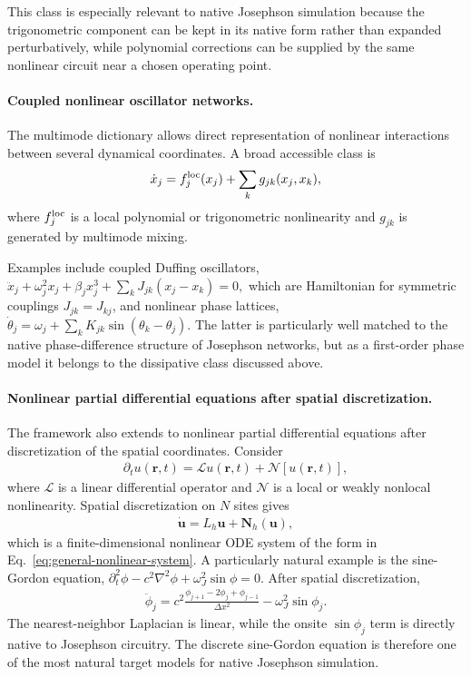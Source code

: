 \documentclass[pra,twocolumn,superscriptaddress,nofootinbib,floatfix]{revtex4-2}
\theoremstyle{remark}
\begin{document}
This class is especially relevant to native Josephson simulation because the trigonometric component can be kept in its native form rather than expanded perturbatively, while polynomial corrections can be supplied by the same nonlinear circuit near a chosen operating point.

\paragraph{Coupled nonlinear oscillator networks.}
The multimode dictionary allows direct representation of nonlinear interactions between several dynamical coordinates. A broad accessible class is
\begin{align}
\dot x_j=f_j^{\rm loc}(x_j)+\sum_{k}g_{jk}(x_j,x_k),
\label{eq:coupled-network}
\end{align}
where \(f_j^{\rm loc}\) is a local polynomial or trigonometric nonlinearity and \(g_{jk}\) is generated by multimode mixing.

Examples include coupled Duffing oscillators,
\(\ddot x_j+\omega_j^2x_j+\beta_jx_j^3+\sum_kJ_{jk}(x_j-x_k)=0,\)
which are Hamiltonian for symmetric couplings \(J_{jk}=J_{kj}\), and nonlinear phase lattices,
\(\dot\theta_j=\omega_j+\sum_kK_{jk}\sin(\theta_k-\theta_j).\)
The latter is particularly well matched to the native phase-difference structure of Josephson networks, but as a first-order phase model it belongs to the dissipative class discussed above.

\paragraph{Nonlinear partial differential equations after spatial discretization.}
The framework also extends to nonlinear partial differential equations after discretization of the spatial coordinates. Consider
\begin{align}
\partial_t u(\mathbf r,t)=\mathcal L u(\mathbf r,t)+\mathcal N[u(\mathbf r,t)],
\label{eq:general-pde}
\end{align}
where \(\mathcal L\) is a linear differential operator and \(\mathcal N\) is a local or weakly nonlocal nonlinearity. Spatial discretization on \(N\) sites gives
\begin{align}
\dot{\mathbf u}=L_h\mathbf u+\mathbf N_h(\mathbf u),
\label{eq:semidiscrete-pde}
\end{align}
which is a finite-dimensional nonlinear ODE system of the form in Eq.~\eqref{eq:general-nonlinear-system}.
A particularly natural example is the sine-Gordon equation,
\(\partial_t^2\phi-c^2\nabla^2\phi+\omega_J^2\sin\phi=0.\)
After spatial discretization,
\begin{align}
\ddot\phi_j=c^2\frac{\phi_{j+1}-2\phi_j+\phi_{j-1}}{\Delta x^2}-\omega_J^2\sin\phi_j.
\label{eq:discrete-sine-gordon}
\end{align}
The nearest-neighbor Laplacian is linear, while the onsite \(\sin\phi_j\) term is directly native to Josephson circuitry. The discrete sine-Gordon equation is therefore one of the most natural target models for native Josephson simulation.
\end{document}

